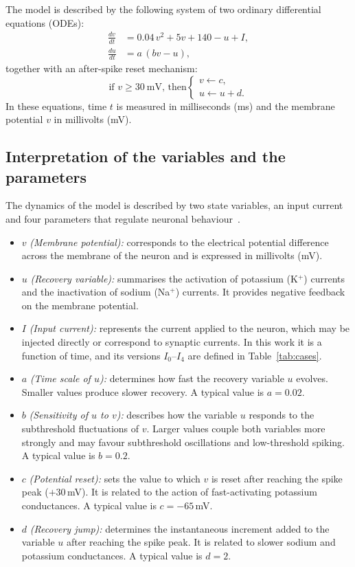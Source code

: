 \documentclass[aps,pre,twocolumn,10pt,nofootinbib,floatfix]{revtex4-2}
\begin{document}
The model is described by the following system of two ordinary differential equations (ODEs):
\begin{align}
  \frac{dv}{dt} &= 0.04\,v^{2} + 5v + 140 - u + I, \label{eq:v}\\
  \frac{du}{dt} &= a\,(bv - u), \label{eq:u}
\end{align}
together with an after-spike reset mechanism:
\begin{equation}
  \text{if } v \geq 30~\text{mV, then}
  \begin{cases}
    v \leftarrow c,\\
    u \leftarrow u + d.
  \end{cases}
  \label{eq:reset}
\end{equation}
In these equations, time $t$ is measured in milliseconds (ms) and the membrane potential $v$
in millivolts (mV).

\subsection{Interpretation of the variables and the parameters}

The dynamics of the model is described by two state variables, an input current and four
parameters that regulate neuronal behaviour~\cite{izhikevich2003}.
\begin{itemize}
  \item $v$ \emph{(Membrane potential):} corresponds to the electrical potential difference
  across the membrane of the neuron and is expressed in millivolts (mV).
  \item $u$ \emph{(Recovery variable):} summarises the activation of potassium (K$^{+}$)
  currents and the inactivation of sodium (Na$^{+}$) currents. It provides negative feedback
  on the membrane potential.
  \item $I$ \emph{(Input current):} represents the current applied to the neuron, which may be
  injected directly or correspond to synaptic currents. In this work it is a function of time,
  and its versions $I_0$--$I_4$ are defined in Table~\ref{tab:cases}.
  \item $a$ \emph{(Time scale of $u$):} determines how fast the recovery variable $u$ evolves.
  Smaller values produce slower recovery. A typical value is $a = 0.02$.
  \item $b$ \emph{(Sensitivity of $u$ to $v$):} describes how the variable $u$ responds to the
  subthreshold fluctuations of $v$. Larger values couple both variables more strongly and may
  favour subthreshold oscillations and low-threshold spiking. A typical value is $b = 0.2$.
  \item $c$ \emph{(Potential reset):} sets the value to which $v$ is reset after reaching the
  spike peak ($+30$\,mV). It is related to the action of fast-activating potassium
  conductances. A typical value is $c = -65$\,mV.
  \item $d$ \emph{(Recovery jump):} determines the instantaneous increment added to the
  variable $u$ after reaching the spike peak. It is related to slower sodium and potassium
  conductances. A typical value is $d = 2$.
\end{itemize}
\end{document}
